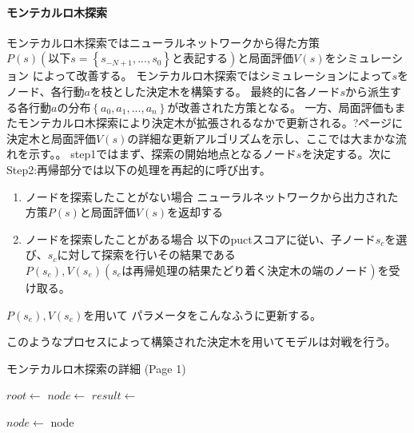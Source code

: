 \paragraph{モンテカルロ木探索}
モンテカルロ木探索ではニューラルネットワークから得た方策$P(s)(以下s=\left\{ s_{-N+1}, ..., s_0 \right\}と表記する)$と局面評価$V(s)$をシミュレーション
によって改善する。
モンテカルロ木探索ではシミュレーションによって$s$をノード、各行動$a$を枝とした決定木を構築する。
最終的に各ノード$s$から派生する各行動$a$の分布$\left\{a_0, a_1, ..., a_n\right\}$が改善された方策となる。
一方、局面評価もまたモンテカルロ木探索により決定木が拡張されるなかで更新される。?ページに決定木と局面評価$V(s)$の詳細な更新アルゴリズムを示し、ここでは大まかな流れを示す。。
step1ではまず、探索の開始地点となるノード$s$を決定する。次にStep2:再帰部分では以下の処理を再起的に呼び出す。
\begin{enumerate}
	\item ノードを探索したことがない場合
	ニューラルネットワークから出力された方策$P(s)$と局面評価$V(s)$を返却する
	\item ノードを探索したことがある場合
	以下のpuctスコアに従い、子ノード$s_c$を選び、$s_c$に対して探索を行いその結果である$P(s_e), V(s_e)(s_eは再帰処理の結果たどり着く
	決定木の端のノード)$を受け取る。
\end{enumerate}

$P(s_e), V(s_e)$を用いて
パラメータをこんなふうに更新する。

このようなプロセスによって構築された決定木を用いてモデルは対戦を行う。
\begin{algorithm}
	\caption{モンテカルロ木探索の詳細 (Page 1)}
	\begin{algorithmic}[1]
				\State {}
			\EndWhile
			\State \Return {}
		\EndFunction
		
			\State $root \gets$ 
				\State $node \gets$ 
				\State $result \gets$ 
				\State {}
			\EndWhile
		\EndFunction
		
			\State \Return {}
		\EndFunction
		
				\State $node \gets$ 
			\EndWhile
				\State \Return {}
			\Else
				\State \Return node
			\EndIf
		\EndFunction
	\end{algorithmic}
\end{algorithm}

